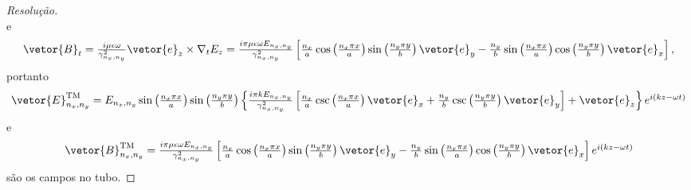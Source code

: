\begin{proof}[Resolução]
\begin{equation*}
    \end{equation*}
    e
    \begin{equation*}
        \textstyle
        \vetor{B}_t = \frac{i \mu \epsilon \omega}{\gamma^2_{n_x, n_y}} \vetor{e}_z \times \nabla_t E_z = \frac{i \pi \mu \epsilon \omega E_{n_x, n_y}}{\gamma^2_{n_x, n_y}}\left[\frac{n_x}{a}\cos\left(\frac{n_x \pi x}{a}\right)\sin\left(\frac{n_y \pi y}{b}\right)\vetor{e}_y - \frac{n_y}{b}\sin\left(\frac{n_x \pi x}{a}\right)\cos\left(\frac{n_y \pi y}{b}\right)\vetor{e}_x\right],
    \end{equation*}
    portanto
    \begin{equation*}
        \textstyle
        \vetor{E}^\mathrm{TM}_{n_x, n_y} = E_{n_x, n_y} \sin \left(\frac{n_x \pi x}{a}\right)\sin\left(\frac{n_y \pi y}{b}\right)\left\{\frac{i \pi k E_{n_x, n_y}}{\gamma^2_{n_x, n_y}}\left[\frac{n_x}{a}\csc\left(\frac{n_x \pi x}{a}\right)\vetor{e}_x + \frac{n_y}{b}\csc\left(\frac{n_y \pi y}{b}\right)\vetor{e}_y\right] + \vetor{e}_z\right\}e^{i(kz - \omega t)}
    \end{equation*}
    e
    \begin{equation*}
        \textstyle
        \vetor{B}^\mathrm{TM}_{n_x, n_y} = \frac{i \pi \mu \epsilon \omega E_{n_x, n_y}}{\gamma^2_{n_x, n_y}}\left[\frac{n_x}{a}\cos\left(\frac{n_x \pi x}{a}\right)\sin\left(\frac{n_y \pi y}{b}\right)\vetor{e}_y - \frac{n_y}{b}\sin\left(\frac{n_x \pi x}{a}\right)\cos\left(\frac{n_y \pi y}{b}\right)\vetor{e}_x\right] e^{i(kz - \omega t)}
    \end{equation*}
    são os campos no tubo.
\end{proof}

